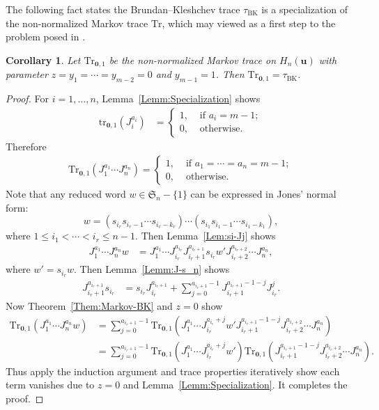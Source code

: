 \documentclass[a4paper, oneside]{amsart}
\numberwithin{equation}{section}
\newtheorem{corollary}[equation]{Corollary}
\theoremstyle{definition}
\theoremstyle{remark}
\begin{document}
The following fact states the Brundan--Kleshchev trace $\tau_{\mathrm{BK}}$ is a specialization of the non-normalized Markov trace $\mathrm{Tr}$, which may viewed as a first step to the problem posed in \cite[Remark~5.7(ii)]{Z2}.
\begin{corollary}\label{Cor:BK-specialization}Let $\mathrm{Tr}_{\boldsymbol{0},1}$ be the non-normalized Markov trace on $H_n(\boldsymbol{u})$ with parameter $z=y_1=\cdots=y_{m-2}=0$ and $y_{m-1}=1$. Then $\mathrm{Tr}_{\boldsymbol{0},1}=\tau_{\mathrm{BK}}$.
\end{corollary}
\begin{proof}For $i=1, \ldots, n$, Lemma~\ref{Lemm:Specialization} shows   \begin{align*}\mathrm{tr}_{\boldsymbol{0},1}(J_{i}^{a_i})&=\left\{\begin{array}
  {ll}1,&\text{ if }a_i=m-1;\\
  0,&\text{ otherwise.}
\end{array}\right.\end{align*}
Therefore
\begin{align*}
 \mathrm{Tr}_{\boldsymbol{0},1}(J_1^{a_1}\cdots J_n^{a_n})=\left\{\begin{array}
  {ll}1,&\text{ if }a_1=\cdots=a_n=m-1;\\
  0,&\text{ otherwise.}
\end{array}\right.
\end{align*}
Note that any reduced word $w\in\mathfrak{S}_n-\{1\}$ can be expressed in Jones' normal form:
 \begin{equation*}
  w=(s_{i_r}s_{i_r-1}\cdots s_{i_r-k_r})\cdots(s_{i_1}s_{i_1-1}\cdots s_{i_1-k_1}),
 \end{equation*}
   where $1\leq i_1<\cdots<i_r\leq n-1$. Then Lemma~\ref{Lem:si-Jj} shows
  \begin{align*}
  J_1^{a_1}\cdots J_n^{a_n}w&=J_1^{a_1}\cdots J_{i_r}^{a_{i_r}}J_{i_r+1}^{a_{i_r+1}}s_{i_r}w'J_{i_r+2}^{a_{i_r+2}}\cdots J_n^{a_n},\end{align*}
  where $w'=s_{i_r}w$.
  Then Lemma~\ref{Lemm:J-s_n} shows
  \begin{align*}J_{i_r+1}^{a_{i_r+1}}s_{i_r}&= s_{i_r}J_{i_r}^{a_{i_r+1}}+\sum_{j=0}^{a_{i_r+1}-1}J_{i_r+1}^{a_{i_r+1}-1-j}J_{i_r}^j.
 \end{align*}
 Now Theorem~\ref{Them:Markov-BK} and $z=0$ show
 \begin{align*}
  \mathrm{Tr}_{\boldsymbol{0},1}(J_1^{a_1}\cdots J_n^{a_n}w)&=\sum_{j=0}^{a_{i_r+1}-1}\mathrm{Tr}_{\boldsymbol{0},1}(J_1^{a_1}\cdots J_{i_r}^{a_{i_r}+j}w'J_{i_r+1}^{a_{i_r+1}-1-j}J_{i_r+2}^{a_{i_r+2}}\cdots J_n^{a_n})\\
  &=\sum_{j=0}^{a_{i_r+1}-1}\mathrm{Tr}_{\boldsymbol{0},1}(J_1^{a_1}\cdots J_{i_r}^{a_{i_r}+j}w')\mathrm{Tr}_{\boldsymbol{0},1}(J_{i_r+1}^{a_{i_r+1}-1-j}J_{i_r+2}^{a_{i_r+2}}\cdots J_n^{a_n}).\end{align*}
 Thus apply the induction argument and trace properties iteratively show each term vanishes due to $z=0$ and Lemma~\ref{Lemm:Specialization}.
 It completes the proof.
\end{proof}
\end{document}
